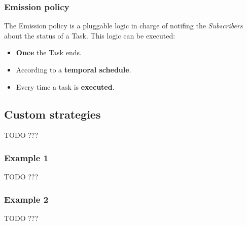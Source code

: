 \subsubsection{Emission policy}
The Emission policy is a pluggable logic in charge of notifing the
\emph{Subscribers} about the status of a Task. This logic can be executed:
\begin{itemize}
    \item \textbf{Once} the Task ends.

    \item According to a \textbf{temporal schedule}.

    \item Every time a task is \textbf{executed}.
\end{itemize}



\subsection{Custom strategies}
TODO ???
\subsubsection{Example 1}
TODO ???
\subsubsection{Example 2}
TODO ???
